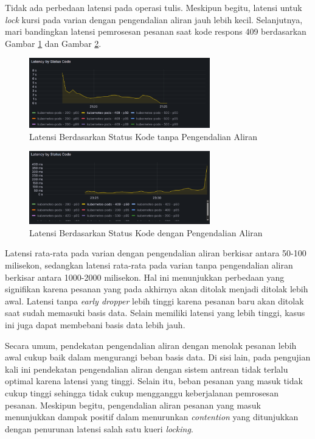 Tidak ada perbedaan latensi pada operasi tulis. Meskipun begitu, latensi untuk \textit{lock} kursi pada varian dengan pengendalian aliran jauh lebih kecil. Selanjutnya, mari bandingkan latensi pemrosesan pesanan saat kode respons 409 berdasarkan Gambar \ref{fig:latency-by-code-nofc} dan Gambar \ref{fig:latency-by-code-fc}.

\begin{figure}[htbp]
    \centering
    \includegraphics[width=0.7\textwidth]{resources/chapter-4/latency-by-code-nofc-pg-stress-0.png}
    \caption{Latensi Berdasarkan Status Kode tanpa Pengendalian Aliran}
    \label{fig:latency-by-code-nofc}
\end{figure}

\begin{figure}[htbp]
    \centering
    \includegraphics[width=0.7\textwidth]{resources/chapter-4/latency-by-code-fc-pg-stress-0.png}
    \caption{Latensi Berdasarkan Status Kode dengan Pengendalian Aliran}
    \label{fig:latency-by-code-fc}
\end{figure}

Latensi rata-rata pada varian dengan pengendalian aliran berkisar antara 50-100 milisekon, sedangkan latensi rata-rata pada varian tanpa pengendalian aliran berkisar antara 1000-2000 milisekon. Hal ini menunjukkan perbedaan yang signifikan karena pesanan yang pada akhirnya akan ditolak menjadi ditolak lebih awal. Latensi tanpa \textit{early dropper} lebih tinggi karena pesanan baru akan ditolak saat sudah memasuki basis data. Selain memiliki latensi yang lebih tinggi, kasus ini juga dapat membebani basis data lebih jauh.

Secara umum, pendekatan pengendalian aliran dengan menolak pesanan lebih awal cukup baik dalam mengurangi beban basis data. Di sisi lain, pada pengujian kali ini pendekatan pengendalian aliran dengan sistem antrean tidak terlalu optimal karena latensi yang tinggi. Selain itu, beban pesanan yang masuk tidak cukup tinggi sehingga tidak cukup mengganggu keberjalanan pemrosesan pesanan. Meskipun begitu, pengendalian aliran pesanan yang masuk menunjukkan dampak positif dalam menurunkan \textit{contention} yang ditunjukkan dengan penurunan latensi salah satu kueri \textit{locking}.

